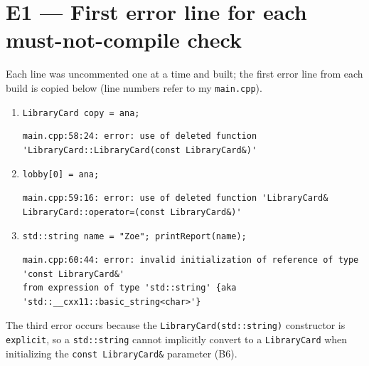 \documentclass[11pt]{article}
\begin{document}
\section*{E1 --- First error line for each must-not-compile check}

Each line was uncommented one at a time and built; the first error line from
each build is copied below (line numbers refer to my \texttt{main.cpp}).

\begin{enumerate}[leftmargin=2em]
\item \texttt{LibraryCard copy = ana;}
\begin{verbatim}
main.cpp:58:24: error: use of deleted function 'LibraryCard::LibraryCard(const LibraryCard&)'
\end{verbatim}

\item \texttt{lobby[0] = ana;}
\begin{verbatim}
main.cpp:59:16: error: use of deleted function 'LibraryCard& LibraryCard::operator=(const LibraryCard&)'
\end{verbatim}

\item \texttt{std::string name = "Zoe";  printReport(name);}
\begin{verbatim}
main.cpp:60:44: error: invalid initialization of reference of type 'const LibraryCard&'
from expression of type 'std::string' {aka 'std::__cxx11::basic_string<char>'}
\end{verbatim}
\end{enumerate}

The third error occurs because the \texttt{LibraryCard(std::string)}
constructor is \texttt{explicit}, so a \texttt{std::string} cannot implicitly
convert to a \texttt{LibraryCard} when initializing the
\texttt{const LibraryCard\&} parameter (B6).
\end{document}
